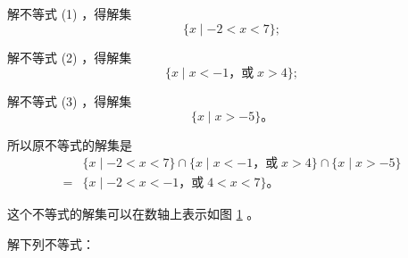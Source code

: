 解不等式 (1) ，得解集
$$ \{ x \mid -2 < x < 7 \} ;$$

解不等式 (2) ，得解集
$$ \{ x \mid x < -1 \text{，或}\; x > 4 \} ;$$

解不等式 (3) ，得解集
$$ \{ x \mid x > -5 \} \text{。} $$

所以原不等式的解集是
\begin{align*}
        & \{ x \mid -2 < x < 7 \} \cap \{ x \mid x < -1 \text{，或}\; x > 4 \} \cap \{ x \mid x > -5 \} \\
    ={} & \{ x \mid -2 < x < -1 \text{，或}\; 4 < x < 7 \} \text{。}
\end{align*}

这个不等式的解集可以在数轴上表示如图 \ref{fig:3-3} 。

\begin{figure}[htbp]
    \centering
    
    \caption{}\label{fig:3-3}
\end{figure}

\lianxi

解下列不等式：
\begin{xiaotis}
\setcounter{cntxiaoti}{0}




\end{xiaotis}

